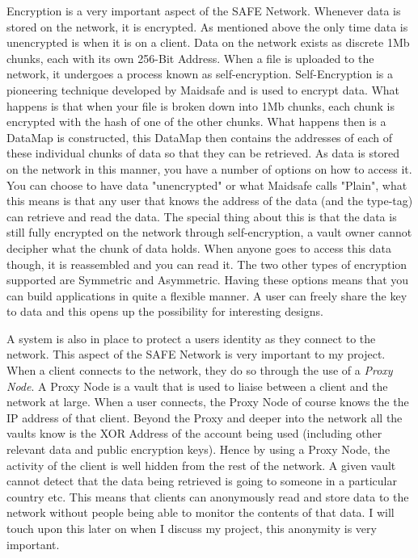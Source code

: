 \documentclass{l4proj}
\begin{document}
Encryption is a very important aspect of the SAFE Network. Whenever data is stored on the network, it is encrypted. As mentioned above the only time data is unencrypted is when it is on a client. Data on the network exists as discrete 1Mb chunks, each with its own 256-Bit Address. When a file is uploaded to the network, it undergoes a process known as self-encryption. Self-Encryption is a pioneering technique developed by Maidsafe and is used to encrypt data. What happens is that when your file is broken down into 1Mb chunks, each chunk is encrypted with the hash of one of the other chunks. What happens then is a DataMap is constructed, this DataMap then contains the addresses of each of these individual chunks of data so that they can be retrieved. As data is stored on the network in this manner, you have a number of options on how to access it. You can choose to have data "unencrypted" or what Maidsafe calls "Plain", what this means is that any user that knows the address of the data (and the type-tag) can retrieve and read the data. The special thing about this is that the data is still fully encrypted on the network through self-encryption, a vault owner cannot decipher what the chunk of data holds. When anyone goes to access this data though, it is reassembled and you can read it. The two other types of encryption supported are Symmetric and Asymmetric. Having these options means that you can build applications in quite a flexible manner. A user can freely share the key to data and this opens up the possibility for interesting designs.

A system is also in place to protect a users identity as they connect to the network. This aspect of the SAFE Network is very important to my project. When a client connects to the network, they do so through the use of a \textit{Proxy Node}. A Proxy Node is a vault that is used to liaise between a client and the network at large. When a user connects, the Proxy Node of course knows the the IP address of that client. Beyond the Proxy and deeper into the network all the vaults know is the XOR Address of the account being used (including other relevant data and public encryption keys). Hence by using a Proxy Node, the activity of the client is well hidden from the rest of the network. A given vault cannot detect that the data being retrieved is going to someone in a particular country etc. This means that clients can anonymously read and store data to the network without people being able to monitor the contents of that data. I will touch upon this later on when I discuss my project, this anonymity is very important.
\end{document}
